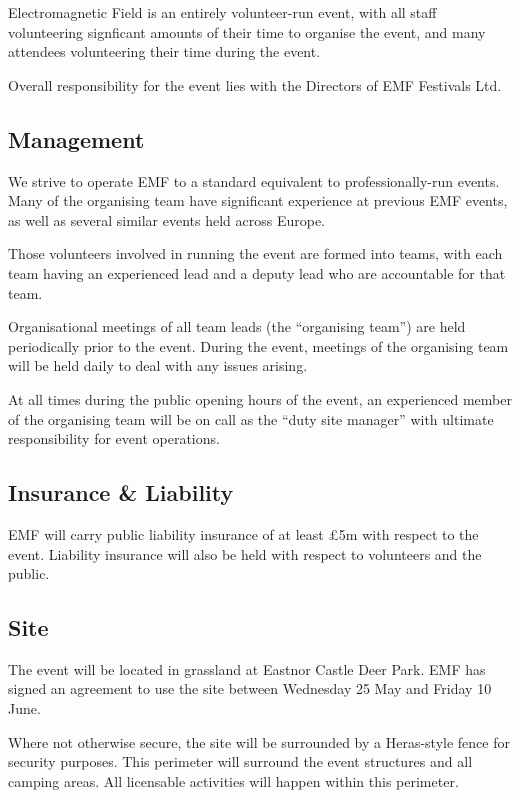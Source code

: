 Electromagnetic Field is an entirely volunteer-run event, with all staff
volunteering signficant amounts of their time to organise the event, and many
attendees volunteering their time during the event.

Overall responsibility for the event lies with the Directors of EMF Festivals Ltd.

\subsection{Management}
We strive to operate EMF to a standard equivalent to professionally-run events.
Many of the organising team have significant experience at previous EMF events,
as well as several similar events held across Europe.

Those volunteers involved in running the event are formed into teams, with each
team having an experienced lead and a deputy lead who are accountable for that
team.

Organisational meetings of all team leads (the ``organising team'') are held
periodically prior to the event.  During the event, meetings of the organising
team will be held daily to deal with any issues arising.

At all times during the public opening hours of the event, an experienced member
of the organising team will be on call as the ``duty site manager'' with
ultimate responsibility for event operations.

\subsection{Insurance \& Liability}

EMF will carry public liability insurance of at least £5m with respect to the event.
Liability insurance will also be held with respect to volunteers and the public.

\subsection{Site}
The event will be located in grassland at Eastnor Castle Deer Park. EMF has signed
an agreement to use the site between Wednesday 25 May and Friday 10 June.

Where not otherwise secure, the site will be surrounded by a Heras-style fence
for security purposes.  This perimeter will surround the event structures and all
camping areas. All licensable activities will happen within this perimeter.

